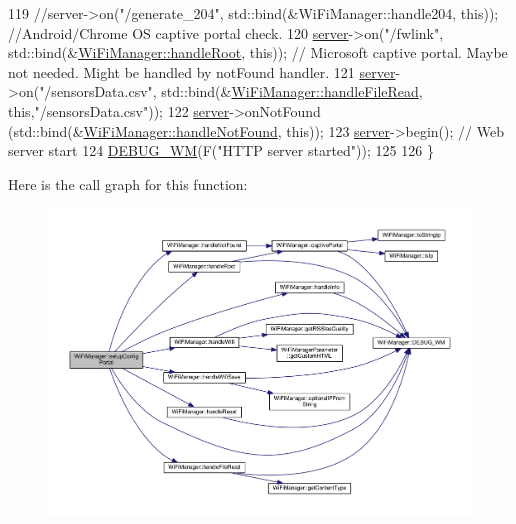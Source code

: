 \begin{DoxyCode}
119   \textcolor{comment}{//server->on("/generate\_204", std::bind(&WiFiManager::handle204, this));  //Android/Chrome OS captive
       portal check.}
120   \hyperlink{class_wi_fi_manager_a509523a01c0395cf0dc235b074f2a5ea}{server}->on(\textcolor{stringliteral}{"/fwlink"}, std::bind(&\hyperlink{class_wi_fi_manager_a47e4c7df7478f690c53ff9f5125c9760}{WiFiManager::handleRoot}, \textcolor{keyword}{this}));  \textcolor{comment}{//
      Microsoft captive portal. Maybe not needed. Might be handled by notFound handler.}
121   \hyperlink{class_wi_fi_manager_a509523a01c0395cf0dc235b074f2a5ea}{server}->on(\textcolor{stringliteral}{"/sensorsData.csv"}, std::bind(&\hyperlink{class_wi_fi_manager_a9e802fa4ca834a622f058a7176f47806}{WiFiManager::handleFileRead}, \textcolor{keyword}{
      this},\textcolor{stringliteral}{"/sensorsData.csv"}));
122   \hyperlink{class_wi_fi_manager_a509523a01c0395cf0dc235b074f2a5ea}{server}->onNotFound (std::bind(&\hyperlink{class_wi_fi_manager_a7d01f7de3e4b76acdabffac79fa3d0ab}{WiFiManager::handleNotFound}, \textcolor{keyword}{this}));
123   \hyperlink{class_wi_fi_manager_a509523a01c0395cf0dc235b074f2a5ea}{server}->begin(); \textcolor{comment}{// Web server start}
124   \hyperlink{class_wi_fi_manager_ae5f595c670ccbcf9a191baf50f5c7c26}{DEBUG\_WM}(F(\textcolor{stringliteral}{"HTTP server started"}));
125 
126 \}
\end{DoxyCode}
Here is the call graph for this function\+:
\nopagebreak
\begin{figure}[H]
\begin{center}
\leavevmode
\includegraphics[width=350pt]{d4/dc8/class_wi_fi_manager_a1743325d0dd86d011df96b22d2a0ddd6_cgraph}
\end{center}
\end{figure}
